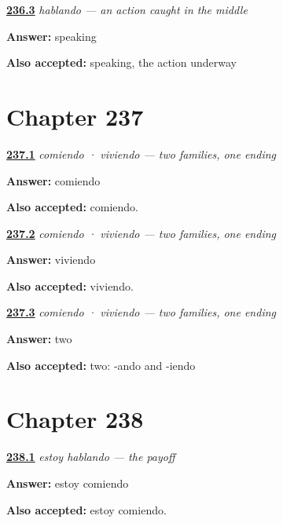 \noindent\begin{minipage}[t]{\linewidth}
\raggedright
\hyperlink{review-ES-C62-hablando-mean}{\textbf{236.3}} \emph{hablando — an action caught in the middle}\par
\small \textbf{Answer:} speaking\par
\footnotesize \textbf{Also accepted:} speaking, the action underway
\end{minipage}\par\medskip

\section*{Chapter 237}

\noindent\begin{minipage}[t]{\linewidth}
\raggedright
\hyperlink{review-ES-C62-comiendo-er}{\textbf{237.1}} \emph{comiendo · viviendo — two families, one ending}\par
\small \textbf{Answer:} comiendo\par
\footnotesize \textbf{Also accepted:} comiendo.
\end{minipage}\par\medskip

\noindent\begin{minipage}[t]{\linewidth}
\raggedright
\hyperlink{review-ES-C62-comiendo-ir}{\textbf{237.2}} \emph{comiendo · viviendo — two families, one ending}\par
\small \textbf{Answer:} viviendo\par
\footnotesize \textbf{Also accepted:} viviendo.
\end{minipage}\par\medskip

\noindent\begin{minipage}[t]{\linewidth}
\raggedright
\hyperlink{review-ES-C62-comiendo-count}{\textbf{237.3}} \emph{comiendo · viviendo — two families, one ending}\par
\small \textbf{Answer:} two\par
\footnotesize \textbf{Also accepted:} two: -ando and -iendo
\end{minipage}\par\medskip

\section*{Chapter 238}

\noindent\begin{minipage}[t]{\linewidth}
\raggedright
\hyperlink{review-ES-C62-estoy-hablando-say}{\textbf{238.1}} \emph{estoy hablando — the payoff}\par
\small \textbf{Answer:} estoy comiendo\par
\footnotesize \textbf{Also accepted:} estoy comiendo.
\end{minipage}\par\medskip

